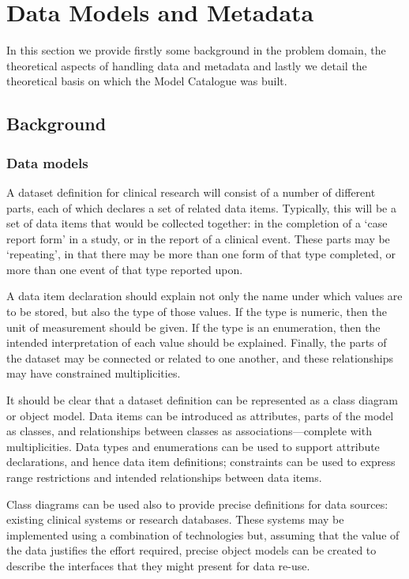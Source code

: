\section{Data Models and Metadata}
In this section we provide firstly some background in the problem domain, the theoretical aspects of handling data and metadata and lastly we detail the theoretical basis on which the Model Catalogue was built.
\subsection{Background}
\subsubsection{Data models}

A dataset definition for clinical research will consist of a number of
different parts, each of which declares a set of related data items.
Typically, this will be a set of data items that would be collected
together: in the completion of a `case report form' in a study, or in
the report of a clinical event.  These parts may be `repeating', in
that there may be more than one form of that type completed, or more
than one event of that type reported upon.  

A data item declaration should explain not only the name under which
values are to be stored, but also the type of those values.  If the
type is numeric, then the unit of measurement should be given.  If the
type is an enumeration, then the intended interpretation of each value
should be explained.  Finally, the parts of the dataset may be
connected or related to one another, and these relationships may have
constrained multiplicities.

It should be clear that a dataset definition can be represented as a
class diagram or object model.  Data items can be introduced as
attributes, parts of the model as classes, and relationships between
classes as associations---complete with multiplicities.  Data types
and enumerations can be used to support attribute declarations, and
hence data item definitions; constraints can be used to express range
restrictions and intended relationships between data items.

Class diagrams can be used also to provide precise definitions for
data sources: existing clinical systems or research databases.  These
systems may be implemented using a combination of technologies but,
assuming that the value of the data justifies the effort required,
precise object models can be created to describe the interfaces that
they might present for data re-use. 

